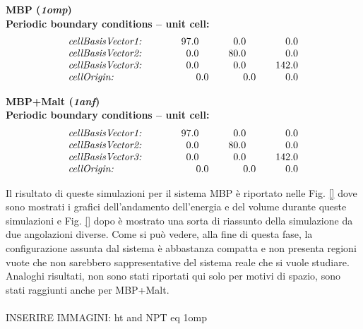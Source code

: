 \begin{itemize}
\begin{center}
\textbf{MBP (\textit{1omp})\\Periodic boundary conditions -- unit cell:}
\vspace{-0.25cm}
\begin{equation*}
\begin{array}{lrrr}
\text{\textit{cellBasisVector1:}} \qquad\quad & 97.0 \qquad & 0.0 \qquad & 0.0\\
\text{\textit{cellBasisVector2:}} \qquad\quad & 0.0 \qquad & 80.0 \qquad & 0.0\\
\text{\textit{cellBasisVector3:}} \qquad\quad & 0.0 \qquad & 0.0 \qquad & 142.0\\
\text{\textit{cellOrigin:}} \qquad & 0.0 \quad & 0.0 \quad & 0.0\\
\end{array}
\end{equation*}

\textbf{MBP+Malt (\textit{1anf})\\Periodic boundary conditions -- unit cell:}
\vspace{-0.25cm}
\begin{equation*}
\begin{array}{lrrr}
\text{\textit{cellBasisVector1:}} \qquad\quad & 97.0 \qquad & 0.0 \qquad & 0.0\\
\text{\textit{cellBasisVector2:}} \qquad\quad & 0.0 \qquad & 80.0 \qquad & 0.0\\
\text{\textit{cellBasisVector3:}} \qquad\quad & 0.0 \qquad & 0.0 \qquad & 142.0\\
\text{\textit{cellOrigin:}} \qquad & 0.0 \quad & 0.0 \quad & 0.0\\
\end{array}
\end{equation*}
\end{center}

Il risultato di queste simulazioni per il sistema MBP è riportato nelle Fig. \ref{} dove sono mostrati i grafici dell'andamento dell'energia e del volume durante queste simulazioni e Fig. \ref{} dopo è mostrato una sorta di riassunto della simulazione da due angolazioni diverse. Come si può vedere, alla fine di questa fase, la configurazione assunta dal sistema è abbastanza compatta e non presenta regioni vuote che non sarebbero sappresentative del sistema reale che si vuole studiare. Analoghi risultati, non sono stati riportati qui solo per motivi di spazio, sono stati raggiunti anche per MBP+Malt.\\
\\
INSERIRE IMMAGINI: ht and NPT eq 1omp\\


\end{itemize}
